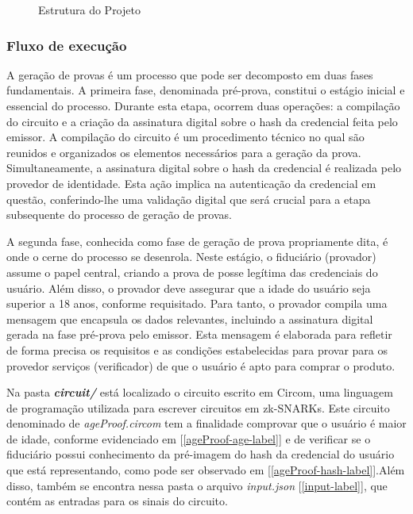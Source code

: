 \begin{figure}[h]
    \centering
    \begin{minipage}{.2\textwidth}
    \end{minipage}
    \caption{Estrutura do Projeto}
    \label{fig:organização}
\end{figure}


\subsubsection{Fluxo de execução}

A geração de provas é um processo que pode ser decomposto em duas fases fundamentais. A primeira fase, denominada pré-prova, constitui o estágio inicial e essencial do processo. Durante esta etapa, ocorrem duas operações: a compilação do circuito e a criação da assinatura digital sobre o hash da credencial feita pelo emissor. A compilação do circuito é um procedimento técnico no qual são reunidos e organizados os elementos necessários para a geração da prova. Simultaneamente, a assinatura digital sobre o hash da credencial é realizada pelo provedor de identidade. Esta ação implica na autenticação da credencial em questão, conferindo-lhe uma validação digital que será crucial para a etapa subsequente do processo de geração de provas.

A segunda fase, conhecida como fase de geração de prova propriamente dita, é onde o cerne do processo se desenrola. Neste estágio, o fiduciário (provador) assume o papel central, criando a prova de posse legítima das credenciais do usuário. Além disso, o provador deve assegurar que a idade do usuário seja superior a 18 anos, conforme requisitado. Para tanto, o provador compila uma mensagem que encapsula os dados relevantes, incluindo a assinatura digital gerada na fase pré-prova pelo emissor. Esta mensagem é elaborada para refletir de forma precisa os requisitos e as condições estabelecidas para provar para os provedor serviços (verificador) de que o usuário é apto para comprar o produto.



Na pasta\textbf{\textit{ circuit/}} está localizado o circuito escrito em Circom, uma linguagem de programação utilizada para escrever circuitos em zk-SNARKs. Este circuito denominado de \textit{ageProof.circom} tem a finalidade comprovar que o usuário é maior de idade, conforme evidenciado em [\ref{ageProof-age-label}] e de verificar se o fiduciário possui conhecimento da pré-imagem do hash da credencial do usuário que está representando, como pode ser observado em [\ref{ageProof-hash-label}].Além disso, também se encontra nessa pasta o arquivo \textit{input.json} [\ref{input-label}], que contém as entradas para os sinais do circuito. 

